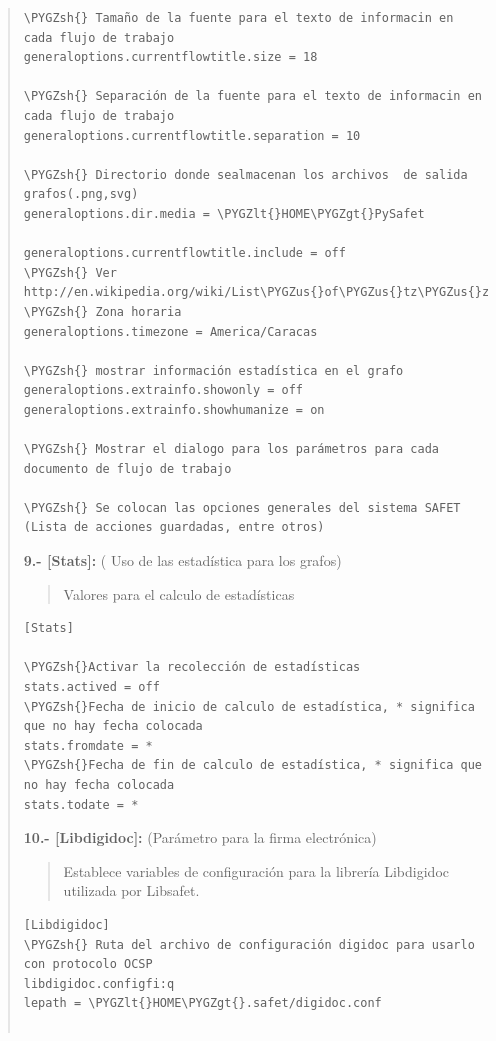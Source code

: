 \documentclass[letterpaper,11pt,spanish]{sphinxmanual}
\def\PYGZus{\char`\_}
\def\PYGZlt{\char`\<}
\def\PYGZgt{\char`\>}
\def\PYGZsh{\char`\#}
\begin{document}
\begin{quote}
\begin{Verbatim}[commandchars=\\\{\}]
\PYGZsh{} Tamaño de la fuente para el texto de informacin en cada flujo de trabajo
generaloptions.currentflowtitle.size = 18

\PYGZsh{} Separación de la fuente para el texto de informacin en cada flujo de trabajo
generaloptions.currentflowtitle.separation = 10

\PYGZsh{} Directorio donde sealmacenan los archivos  de salida grafos(.png,svg)
generaloptions.dir.media = \PYGZlt{}HOME\PYGZgt{}PySafet

generaloptions.currentflowtitle.include = off
\PYGZsh{} Ver http://en.wikipedia.org/wiki/List\PYGZus{}of\PYGZus{}tz\PYGZus{}zones\PYGZus{}by\PYGZus{}name
\PYGZsh{} Zona horaria
generaloptions.timezone = America/Caracas

\PYGZsh{} mostrar información estadística en el grafo
generaloptions.extrainfo.showonly = off
generaloptions.extrainfo.showhumanize = on

\PYGZsh{} Mostrar el dialogo para los parámetros para cada documento de flujo de trabajo

\PYGZsh{} Se colocan las opciones generales del sistema SAFET (Lista de acciones guardadas, entre otros)
\end{Verbatim}

\textbf{9.- {[}Stats{]}:} ( Uso de las estadística para los grafos)
\begin{quote}

Valores para el calculo de estadísticas
\end{quote}

\begin{Verbatim}[commandchars=\\\{\}]
[Stats]

\PYGZsh{}Activar la recolección de estadísticas
stats.actived = off
\PYGZsh{}Fecha de inicio de calculo de estadística, * significa que no hay fecha colocada
stats.fromdate = *
\PYGZsh{}Fecha de fin de calculo de estadística, * significa que no hay fecha colocada
stats.todate = *
\end{Verbatim}

\textbf{10.- {[}Libdigidoc{]}:} (Parámetro para la firma electrónica)
\begin{quote}

Establece variables de configuración para la librería Libdigidoc utilizada por Libsafet.
\end{quote}

\begin{Verbatim}[commandchars=\\\{\}]
[Libdigidoc]
\PYGZsh{} Ruta del archivo de configuración digidoc para usarlo con protocolo OCSP
libdigidoc.configfi:q
lepath = \PYGZlt{}HOME\PYGZgt{}.safet/digidoc.conf


\end{Verbatim}
\end{quote}
\end{document}
